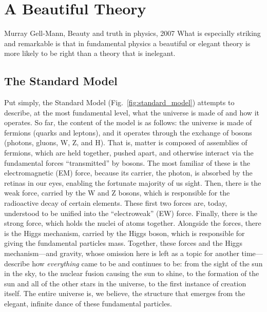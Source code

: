 \chapter{A Beautiful Theory}
\begin{aquote}{Murray Gell-Mann, Beauty and truth in physics, 2007}
    What is especially striking and remarkable is that in fundamental physics 
    a beautiful or elegant theory is more likely to be right 
    than a theory that is inelegant.
\end{aquote}

\section{The Standard Model}
Put simply, the Standard Model (Fig.~\ref{fig:standard_model}) attempts to describe, at the most fundamental level, what the universe is made of and how it operates. 
So far, the content of the model is as follows: the universe is made of fermions (quarks and leptons), and it operates through the exchange of bosons (photons, gluons, W, Z, and H). 
That is, matter\footnotemark{} is composed of assemblies of fermions, which are held together, pushed apart, and otherwise interact via the fundamental forces ``transmitted'' by bosons. 
The most familiar of these is the electromagnetic (EM) force, because its carrier, the photon, is absorbed by the retinas in our eyes, enabling the fortunate majority of us sight. 
Then, there is the weak force, carried by the W and Z bosons, which is responsible for the radioactive decay of certain elements. 
These first two forces are, today, understood to be unified into the ``electroweak'' (EW) force. 
Finally, there is the strong force, which holds the nuclei of atoms together. 
Alongside the forces, there is the Higgs mechanism, carried by the Higgs boson, which is responsible for giving the fundamental particles mass. 
Together, these forces and the Higgs mechanism---and gravity, whose omission here is left as a topic for another time---describe how \textit{everything} came to be and continues to be: from the sight of the sun in the sky, to the nuclear fusion causing the sun to shine, to the formation of the sun and all of the other stars in the universe, to the first instance of creation itself. 
The entire universe is, we believe, the structure that emerges from the elegant, infinite dance of these fundamental particles. 


